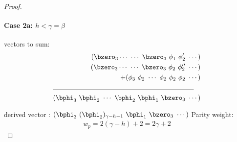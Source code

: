 \begin{proof}
\newpage
\paragraph{Case 2a: $h<\gamma=\beta$ \newline}
 vectors to sum:
\begin{align*}
(\bzero_3\cdots~\cdots~\bzero_3~\phi_1~\phi'_2~\cdots)\\
(\bzero_3\cdots~\cdots~\bzero_3~\phi_2~\phi''_2~\cdots)\\
+(\phi_3~\phi_2~\cdots~\phi_2~\phi_2~\phi_2~\cdots)\\
\cline{1-2}
(\bphi_3~\bphi_2~\cdots~\bphi_2~\bphi_1~\bzero_3~\cdots)
\end{align*}


derived vector : $(\bphi_3~(\bphi_2)_{\gamma-h-1}~\bphi_1~\bzero_3~\cdots)$
\newline
Parity weight: \begin{equation}
\begin{split}
w_p=2(\gamma-h)+2 =2\gamma+2
\end{split}
\end{equation}



\end{proof}
